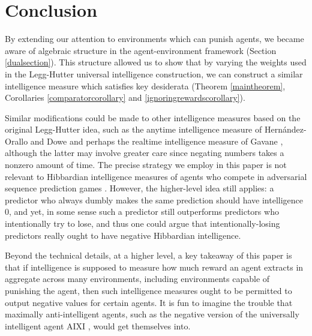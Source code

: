 \documentclass{article}
\begin{document}
\section{Conclusion}
\label{conclusionsecn}

By extending our attention to environments which can punish agents,
we became aware of algebraic structure in the agent-environment
framework (Section \ref{dualsection}). This structure allowed us to
show that by varying the weights used in the Legg-Hutter universal
intelligence construction, we can construct a similar intelligence
measure which satisfies key desiderata (Theorem \ref{maintheorem},
Corollaries \ref{comparatorcorollary} and \ref{ignoringrewardscorollary}).

Similar modifications could be made to other intelligence
measures based on the original Legg-Hutter idea, such as the anytime
intelligence measure of Hern{\'a}ndez-Orallo and Dowe \cite{hernandez}
and perhaps the realtime intelligence measure of Gavane \cite{gavane},
although the latter may involve greater care since negating numbers
takes a nonzero amount of time. The precise strategy we employ in this
paper is not relevant to Hibbardian intelligence measures of agents
who compete in adversarial sequence prediction games
\cite{hibbard} \cite{alexander2021measuring}. However, the higher-level
idea still applies: a predictor who always dumbly
makes the same prediction should have intelligence $0$, and yet, in some sense
such a predictor still outperforms predictors who intentionally try
to lose, and thus one could argue that intentionally-losing predictors
really ought to have negative Hibbardian intelligence.

Beyond the technical details, at a higher level, a key takeaway of
this paper is that if intelligence is supposed to measure how much
reward an agent extracts in aggregate across many environments,
including environments capable of punishing the agent, then such
intelligence measures ought to be permitted to output negative
values for certain agents. It is fun to imagine the trouble
that maximally anti-intelligent
agents, such as the negative version of the universally intelligent
agent AIXI \cite{hutter2004universal}, would get themselves into.




\end{document}
